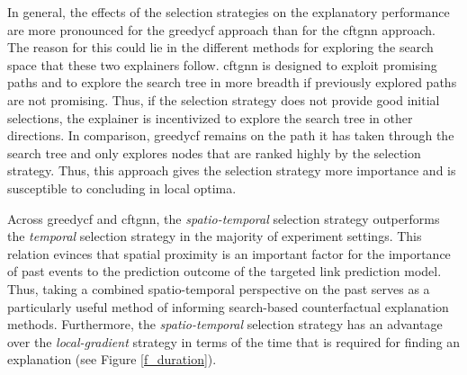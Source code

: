 In general, the effects of the selection strategies on the explanatory performance are more pronounced for the \gls{greedycf} approach than for the \gls{cftgnn} approach. The reason for this could lie in the different methods for exploring the search space that these two explainers follow. \gls{cftgnn} is designed to exploit promising paths and to explore the search tree in more breadth if previously explored paths are not promising. Thus, if the selection strategy does not provide good initial selections, the explainer is incentivized to explore the search tree in other directions. In comparison, \gls{greedycf} remains on the path it has taken through the search tree and only explores nodes that are ranked highly by the selection strategy. Thus, this approach gives the selection strategy more importance and is susceptible to concluding in local optima.

Across \gls{greedycf} and \gls{cftgnn}, the \textit{spatio-temporal} selection strategy outperforms the \textit{temporal} selection strategy in the majority of experiment settings. This relation evinces that spatial proximity is an important factor for the importance of past events to the prediction outcome of the targeted link prediction model. Thus, taking a combined spatio-temporal perspective on the past serves as a particularly useful method of informing search-based counterfactual explanation methods. Furthermore, the \textit{spatio-temporal} selection strategy has an advantage over the \textit{local-gradient} strategy in terms of the time that is required for finding an explanation (see Figure \ref{f_duration}). 



